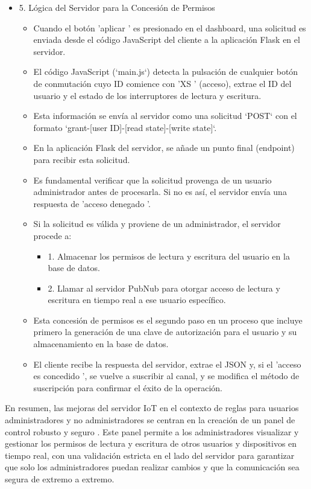 \documentclass{report}
\begin{document}
\begin{itemize}
    \item 5. Lógica del Servidor para la Concesión de Permisos
    \begin{itemize}
        \item Cuando el botón  'aplicar ' es presionado en el dashboard, una solicitud es enviada desde el código JavaScript del cliente a la 
        aplicación Flask en el servidor.
        \item El código JavaScript (`main.js`) detecta la pulsación de cualquier botón de conmutación cuyo ID comience con  'XS ' (acceso), 
        extrae el ID del usuario y el estado de los interruptores de lectura y escritura.
        \item Esta información se envía al servidor como una  solicitud `POST`  con el formato `grant-[user ID]-[read state]-[write state]`.
        \item En la aplicación Flask del servidor, se añade un  punto final (endpoint)  para recibir esta solicitud.
        \item Es  fundamental verificar que la solicitud provenga de un usuario administrador  antes de procesarla. Si no es así, el servidor 
        envía una respuesta de  'acceso denegado '.
        \item Si la solicitud es válida y proviene de un administrador, el servidor procede a:
        \begin{itemize}
            \item 1.   Almacenar los permisos  de lectura y escritura del usuario en la base de datos.
            \item 2.   Llamar al servidor PubNub  para otorgar acceso de lectura y escritura en tiempo real a ese usuario específico.        
        \end{itemize}
        \item Esta concesión de permisos es el segundo paso en un proceso que incluye primero la  generación de una clave de autorización  para 
        el usuario y su almacenamiento en la base de datos.
        \item El cliente recibe la respuesta del servidor, extrae el JSON y, si el  'acceso es concedido ', se vuelve a suscribir al canal, y se 
        modifica el método de suscripción para confirmar el éxito de la operación.
    \end{itemize}
\end{itemize}

En resumen, las mejoras del servidor IoT en el contexto de reglas para usuarios administradores y no administradores se centran en la creación de 
un  panel de control robusto y seguro . Este panel permite a los administradores  visualizar y gestionar los permisos de lectura y escritura  de 
otros usuarios y dispositivos en tiempo real, con una validación estricta en el lado del servidor para garantizar que solo los administradores 
puedan realizar cambios y que la comunicación sea segura de extremo a extremo.
\end{document}

